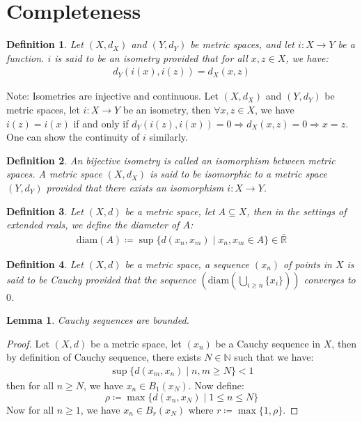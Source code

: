 \documentclass[11pt]{book}
\theoremstyle{break}
\theoremstyle{break}
\newtheorem{lem}{Lemma}[thm]
\newtheorem{defn}{Definition}[corL]
\newcommand{\R}{\mathbb{R}}
\newcommand{\N}{\mathbb{N}}
\newcommand{\note}{\color{red}Note: \color{black}}
\begin{document}
\newpage
\section[Completeness]{\color{red} Completeness\color{black}}
\begin{defn}
Let $(X,d_X)$ and $(Y,d_Y)$ be metric spaces, and let $i:X \to Y$ be a function. $i$ is said to be an isometry provided that for all $x,z \in X$, we have:
\begin{align*}
d_Y(i(x), i(z)) = d_X(x,z)
\end{align*}
\end{defn}

\note Isometries are injective and continuous. Let $(X,d_X)$ and $(Y,d_Y)$ be metric spaces, let $i:X \to Y$ be an isometry, then $\forall x,z \in X$, we have $i(z) = i(x)$ if and only if $d_Y(i(z),i(x)) = 0 \Rightarrow d_X(x,z) = 0 \Rightarrow x=z$. One can show the continuity of $i$ similarly.\\

\begin{defn}
An bijective isometry is called an isomorphism between metric spaces.
A metric space $(X,d_X)$ is said to be isomorphic to a metric space $(Y,d_Y)$ provided that there exists an isomorphism $i:X \to Y$. 
\end{defn}

\begin{defn}
Let $(X,d)$ be a metric space, let $A \subseteq X$, then in the settings of extended reals, we define the diameter of $A$:
\begin{align*}
\text{diam}(A) \coloneqq \sup\{d(x_n,x_m) \mid x_n,x_m \in A\} \in \bar{\R}
\end{align*}
\end{defn}

\begin{defn}
Let $(X,d)$ be a metric space, a sequence $(x_n)$ of points in $X$ is said to be Cauchy provided that the sequence $(\text{diam}(\bigcup_{i \geq n}\{x_i\}))$ converges to $0$. 
\end{defn}

\begin{lem}
Cauchy sequences are bounded.
\end{lem}
\begin{proof}
Let $(X,d)$ be a metric space, let $(x_n)$ be a Cauchy sequence in $X$, then by definition of Cauchy sequence, there exists $N \in \N$ such that we have:
\begin{align*}
\sup\{d(x_m,x_n) \mid n,m \geq N\} < 1
\end{align*}
then for all $n \geq N$, we have $x_n\in B_1(x_N)$. 
Now define: 
$$\rho \coloneqq \max\{d(x_n,x_N)\mid 1\leq n \leq N\}$$
Now for all $n \geq 1$, we have $x_n \in B_{r}(x_N)$ where $r\coloneqq \max\{1,\rho\}$. 
\end{proof}
\end{document}
